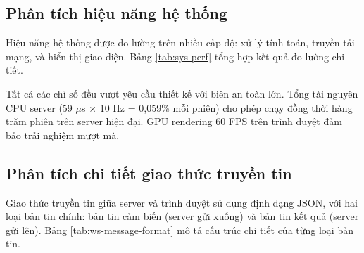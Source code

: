 \subsection{Phân tích hiệu năng hệ thống}

\hspace{0.5cm} Hiệu năng hệ thống được đo lường trên nhiều cấp độ: xử lý tính toán, truyền tải mạng, và hiển thị giao diện. Bảng \ref{tab:sys-perf} tổng hợp kết quả đo lường chi tiết.



\begin{table}[H]
\centering
{}
\caption{Tổng hợp hiệu năng hệ thống}
\label{tab:sys-perf}
\end{table}

Tất cả các chỉ số đều vượt yêu cầu thiết kế với biên an toàn lớn. Tổng tài nguyên CPU server (59 $\mu$s × 10 Hz = 0,059\% mỗi phiên) cho phép chạy đồng thời hàng trăm phiên trên server hiện đại. GPU rendering 60 FPS trên trình duyệt đảm bảo trải nghiệm mượt mà.

\subsection{Phân tích chi tiết giao thức truyền tin}

\hspace{0.5cm} Giao thức truyền tin giữa server và trình duyệt sử dụng định dạng JSON, với hai loại bản tin chính: bản tin cảm biến (server gửi xuống) và bản tin kết quả (server gửi lên). Bảng \ref{tab:ws-message-format} mô tả cấu trúc chi tiết của từng loại bản tin.

